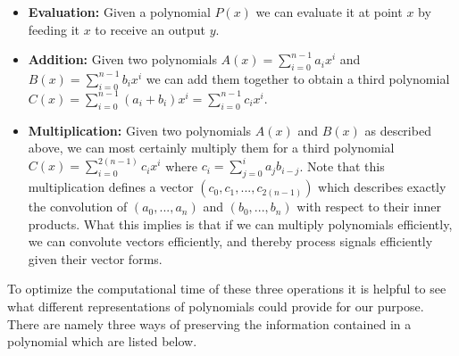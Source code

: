 \documentclass[../article.tex]{subfiles}
\begin{document}
\begin{itemize}
\item{\textbf{Evaluation:}} Given a polynomial $P(x)$ we can evaluate it at point $x$ by feeding it $x$ to receive an output $y$.

\item{\textbf{Addition:}} Given two polynomials $A(x) = \sum_{i=0}^{n-1} a_ix^i$ and $B(x) = \sum_{i=0}^{n-1} b_ix^i$ we can add them together to obtain a third polynomial $C(x) = \sum_{i=0}^{n-1} (a_i+b_i)x^i = \sum_{i=0}^{n-1} c_ix^i$.

\item {\textbf{Multiplication:}} Given two polynomials $A(x)$ and $B(x)$ as described above, we can most certainly multiply them for a third polynomial $C(x) = \sum_{i=0}^{2(n-1)} c_ix^i$ where $c_i = \sum_{j=0}^{i} a_jb_{i-j}$. Note that this multiplication defines a vector $(c_0, c_1, ..., c_{2(n-1)})$ which describes exactly the convolution of $(a_0,..., a_n)$ and $(b_0, ..., b_n)$ with respect to their inner products. What this implies is that if we can multiply polynomials efficiently, we can convolute vectors efficiently, and thereby process signals efficiently given their vector forms.
\end{itemize}

To optimize the computational time of these three operations it is helpful to see what different representations of polynomials could provide for our purpose. There are namely three ways of preserving the information contained in a polynomial which are listed below.
\end{document}

